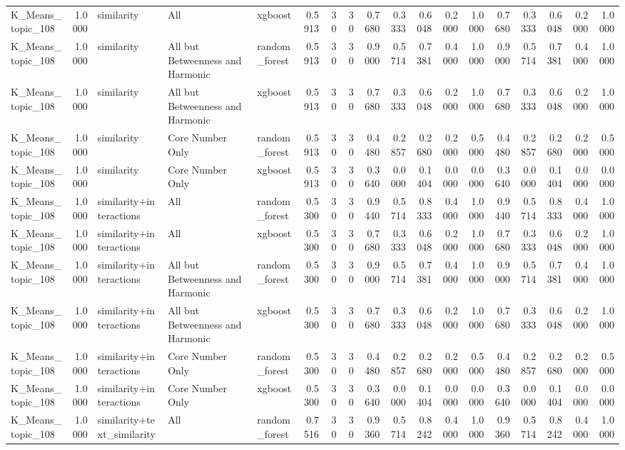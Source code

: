 \begin{tabular}{lrlllrrrrrrrrrrrrr}
K_Means_topic_108 & 1.0000 & similarity & All & xgboost & 0.5913 & 30 & 30 & 0.7680 & 0.3333 & 0.6048 & 0.2000 & 1.0000 & 0.7680 & 0.3333 & 0.6048 & 0.2000 & 1.0000 \\
K_Means_topic_108 & 1.0000 & similarity & All but Betweenness and Harmonic & random_forest & 0.5913 & 30 & 30 & 0.9000 & 0.5714 & 0.7381 & 0.4000 & 1.0000 & 0.9000 & 0.5714 & 0.7381 & 0.4000 & 1.0000 \\
K_Means_topic_108 & 1.0000 & similarity & All but Betweenness and Harmonic & xgboost & 0.5913 & 30 & 30 & 0.7680 & 0.3333 & 0.6048 & 0.2000 & 1.0000 & 0.7680 & 0.3333 & 0.6048 & 0.2000 & 1.0000 \\
K_Means_topic_108 & 1.0000 & similarity & Core Number Only & random_forest & 0.5913 & 30 & 30 & 0.4480 & 0.2857 & 0.2680 & 0.2000 & 0.5000 & 0.4480 & 0.2857 & 0.2680 & 0.2000 & 0.5000 \\
K_Means_topic_108 & 1.0000 & similarity & Core Number Only & xgboost & 0.5913 & 30 & 30 & 0.3640 & 0.0000 & 0.1404 & 0.0000 & 0.0000 & 0.3640 & 0.0000 & 0.1404 & 0.0000 & 0.0000 \\
K_Means_topic_108 & 1.0000 & similarity+interactions & All & random_forest & 0.5300 & 30 & 30 & 0.9440 & 0.5714 & 0.8333 & 0.4000 & 1.0000 & 0.9440 & 0.5714 & 0.8333 & 0.4000 & 1.0000 \\
K_Means_topic_108 & 1.0000 & similarity+interactions & All & xgboost & 0.5300 & 30 & 30 & 0.7680 & 0.3333 & 0.6048 & 0.2000 & 1.0000 & 0.7680 & 0.3333 & 0.6048 & 0.2000 & 1.0000 \\
K_Means_topic_108 & 1.0000 & similarity+interactions & All but Betweenness and Harmonic & random_forest & 0.5300 & 30 & 30 & 0.9000 & 0.5714 & 0.7381 & 0.4000 & 1.0000 & 0.9000 & 0.5714 & 0.7381 & 0.4000 & 1.0000 \\
K_Means_topic_108 & 1.0000 & similarity+interactions & All but Betweenness and Harmonic & xgboost & 0.5300 & 30 & 30 & 0.7680 & 0.3333 & 0.6048 & 0.2000 & 1.0000 & 0.7680 & 0.3333 & 0.6048 & 0.2000 & 1.0000 \\
K_Means_topic_108 & 1.0000 & similarity+interactions & Core Number Only & random_forest & 0.5300 & 30 & 30 & 0.4480 & 0.2857 & 0.2680 & 0.2000 & 0.5000 & 0.4480 & 0.2857 & 0.2680 & 0.2000 & 0.5000 \\
K_Means_topic_108 & 1.0000 & similarity+interactions & Core Number Only & xgboost & 0.5300 & 30 & 30 & 0.3640 & 0.0000 & 0.1404 & 0.0000 & 0.0000 & 0.3640 & 0.0000 & 0.1404 & 0.0000 & 0.0000 \\
K_Means_topic_108 & 1.0000 & similarity+text_similarity & All & random_forest & 0.7516 & 30 & 30 & 0.9360 & 0.5714 & 0.8242 & 0.4000 & 1.0000 & 0.9360 & 0.5714 & 0.8242 & 0.4000 & 1.0000 \\

\end{tabular}
